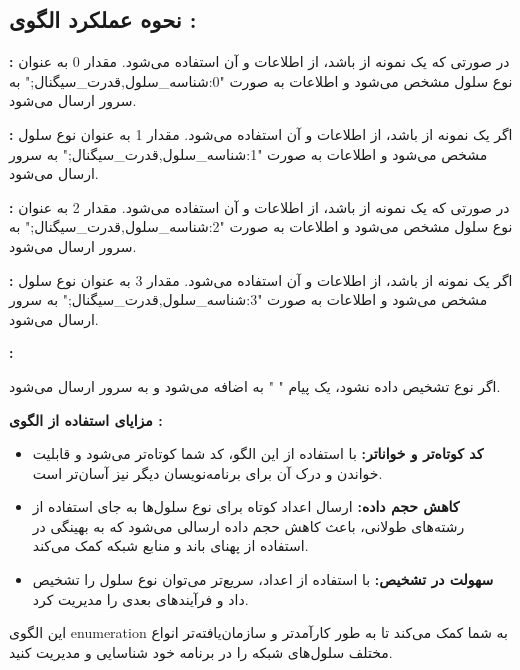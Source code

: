 \documentclass{report}
\begin{document}
\subsection{نحوه عملکرد الگوی
 :}
 
\textbf{:}
در صورتی که
  یک نمونه از
   باشد، از اطلاعات
    و
     آن استفاده می‌شود.
مقدار 0 به عنوان نوع سلول
 مشخص می‌شود و اطلاعات به صورت "0:شناسه\_سلول,قدرت\_سیگنال;" به سرور ارسال می‌شود.

\textbf{:}
اگر 
 یک نمونه از 
  باشد، از اطلاعات
    و
      آن استفاده می‌شود.
مقدار 1 به عنوان نوع سلول
 مشخص می‌شود و اطلاعات به صورت "1:شناسه\_سلول,قدرت\_سیگنال;" به سرور ارسال می‌شود.
 
\textbf{:}
در صورتی که 
 یک نمونه از 
 باشد، از اطلاعات
   و 
    آن استفاده می‌شود.
مقدار 2 به عنوان نوع سلول 
مشخص می‌شود و اطلاعات به صورت "2:شناسه\_سلول,قدرت\_سیگنال;" به سرور ارسال می‌شود.


\textbf{:}
اگر 
 یک نمونه از 
  باشد، از اطلاعات
    و
     آن استفاده می‌شود.
مقدار 3 به عنوان نوع سلول 
 مشخص می‌شود و اطلاعات به صورت "3:شناسه\_سلول,قدرت\_سیگنال;" به سرور ارسال می‌شود.
 
 
\textbf{:}

اگر نوع
 تشخیص داده نشود، یک پیام "
 " به
   اضافه می‌شود و به سرور ارسال می‌شود.
   
\textbf{مزایای استفاده از الگوی
 :}
 \begin{itemize}
 	\item \textbf{کد کوتاه‌تر و خواناتر: }با استفاده از این الگو، کد شما کوتاه‌تر می‌شود و قابلیت خواندن و درک آن برای برنامه‌نویسان دیگر نیز آسان‌تر است.
 	\item 
 	\textbf{کاهش حجم داده: }ارسال اعداد کوتاه برای نوع سلول‌ها به جای استفاده از رشته‌های طولانی، باعث کاهش حجم داده ارسالی می‌شود که به بهینگی در استفاده از پهنای باند و منابع شبکه کمک می‌کند.
 	\item 
 	\textbf{سهولت در تشخیص: }با استفاده از اعداد، سریع‌تر می‌توان نوع سلول را تشخیص داد و فرآیندهای بعدی را مدیریت کرد.
 \end{itemize}
این الگوی
 enumeration
 به شما کمک می‌کند تا به طور کارآمد‌تر و سازمان‌یافته‌تر انواع مختلف سلول‌های شبکه را در برنامه خود شناسایی و مدیریت کنید.
\end{document}
